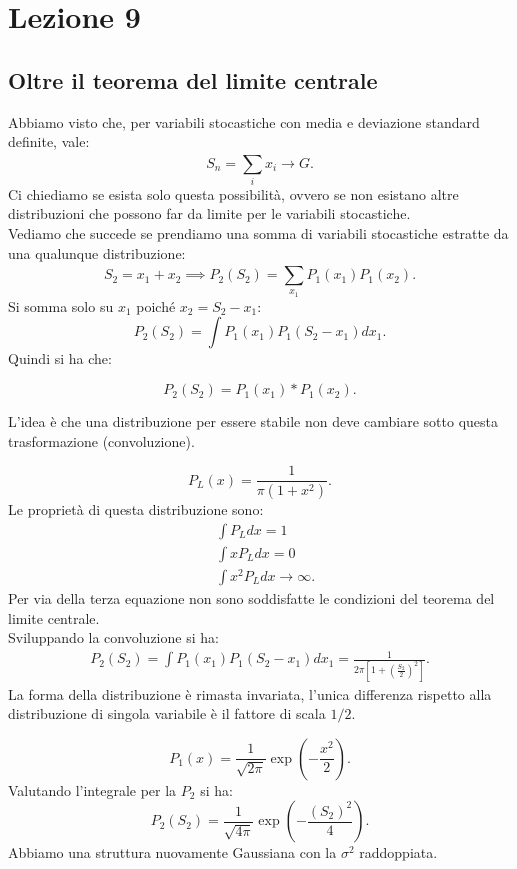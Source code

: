 \section{Lezione 9}%
\label{sub:Lezione 9}
\subsection{Oltre il teorema del limite centrale}%
\label{sub:Distribuzioni fisiche che non rispettano il teorema del limite centrale}
Abbiamo visto che, per variabili stocastiche con media e deviazione standard definite, vale:
\[
    S_n = \sum_{i}^{} x_i \to G
.\] 
Ci chiediamo se esista solo questa possibilità, ovvero se non esistano altre distribuzioni che possono far da limite per le variabili stocastiche.\\
Vediamo che succede se prendiamo una somma di variabili stocastiche estratte da una qualunque distribuzione:
\[
    S_2 = x_1 + x_2 \implies P_2(S_2) = \sum_{x_1}^{} P_1(x_1) P_1(x_2) 
.\] 
Si somma solo su $x_1$ poiché $x_2 = S_2-x_1$:
\[
    P_2(S_2) = \int P_1(x_1) P_1(S_2-x_1) dx_1
.\] 
Quindi si ha che:
\begin{redbox}{}
    \[
	P_2(S_2) = P_1(x_1) * P_1(x_2) 
    .\] 
\end{redbox}
\noindent
L'idea è che una distribuzione per essere stabile non deve cambiare sotto questa trasformazione (convoluzione).
\begin{exmp}
\[
    P_L(x) = \frac{1}{\pi\left(1+x^2\right)}
.\] 
Le proprietà di questa distribuzione sono:
\[\begin{aligned}
    &\int P_L dx = 1\\
    & \int xP_L dx = 0\\
    & \int  x^2P_L dx \to \infty
.\end{aligned}\]
Per via della terza equazione non sono soddisfatte le condizioni del teorema del limite centrale.\\
Sviluppando la convoluzione si ha:
\[\begin{aligned}
    P_2(S_2) = \int P_1(x_1) P_1(S_2-x_1) dx_1 = \frac{1}{2\pi\left[1 + \left(\frac{S_2}{2}\right)^2\right]}
.\end{aligned}\]
La forma della distribuzione è rimasta invariata, l'unica differenza rispetto alla distribuzione di singola variabile è il fattore di scala $1 /2$.
\end{exmp}
\noindent
\begin{exmp}[Gaussiana]
\[
    P_1(x) = \frac{1}{\sqrt{2\pi}}\exp\left(-\frac{x^2}{2}\right)
.\]  
Valutando l'integrale per la $P_2$ si ha:
\[
    P_2(S_2) =\frac{1}{\sqrt{4\pi}}\exp\left(-\frac{(S_2)^2}{4}\right) 
.\] 
Abbiamo una struttura nuovamente Gaussiana con la $\sigma^2$ raddoppiata.
\end{exmp}
